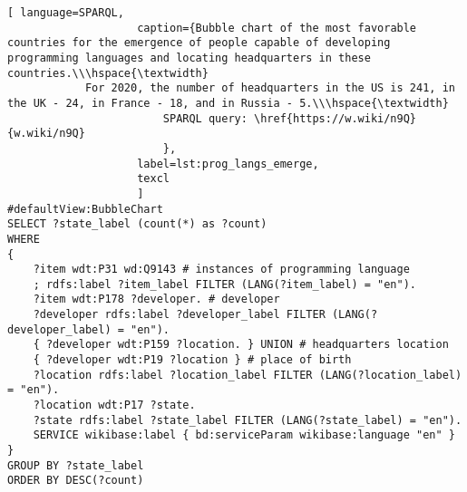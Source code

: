 \begin{lstlisting}[ language=SPARQL, 
                    caption={Bubble chart of the most favorable countries for the emergence of people capable of developing programming languages and locating headquarters in these countries.\\\hspace{\textwidth}
			For 2020, the number of headquarters in the US is 241, in the UK - 24, in France - 18, and in Russia - 5.\\\hspace{\textwidth}
                        SPARQL query: \href{https://w.wiki/n9Q}{w.wiki/n9Q}
                        },
                    label=lst:prog_langs_emerge,
                    texcl 
                    ]
#defaultView:BubbleChart
SELECT ?state_label (count(*) as ?count)
WHERE
{
	?item wdt:P31 wd:Q9143 # instances of programming language
	; rdfs:label ?item_label FILTER (LANG(?item_label) = "en"). 
	?item wdt:P178 ?developer. # developer
	?developer rdfs:label ?developer_label FILTER (LANG(?developer_label) = "en"). 
	{ ?developer wdt:P159 ?location. } UNION # headquarters location
	{ ?developer wdt:P19 ?location } # place of birth
	?location rdfs:label ?location_label FILTER (LANG(?location_label) = "en").
	?location wdt:P17 ?state.
	?state rdfs:label ?state_label FILTER (LANG(?state_label) = "en").
	SERVICE wikibase:label { bd:serviceParam wikibase:language "en" } 	
}
GROUP BY ?state_label
ORDER BY DESC(?count)
\end{lstlisting}%


